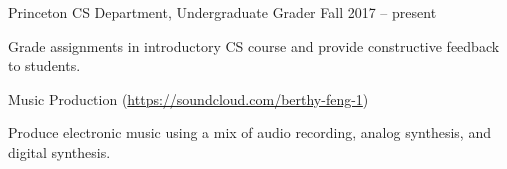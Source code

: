 \documentclass[12pt]{my_resume}
\begin{document}
\vspace{-8pt}

\begin{resitem}{Princeton CS Department, Undergraduate Grader}%
{Fall 2017 -- present}
  \item Grade assignments in introductory CS course and %
  provide constructive feedback to students.
\end{resitem}

\vspace{-8pt}

\begin{resitem}{Music Production %
(\url{https://soundcloud.com/berthy-feng-1})}{}
  \item Produce electronic music using a mix of audio recording, %
  analog synthesis, and digital synthesis.
\end{resitem}
\end{document}
